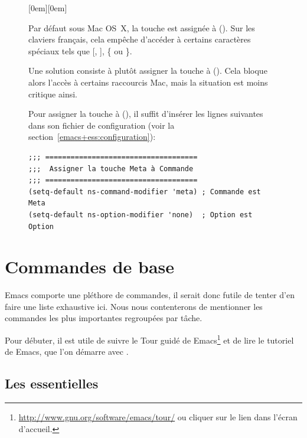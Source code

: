 \begin{figure}[t]
  \begin{framed}
    \begin{minipage}{0.1\linewidth}
      \raisebox{-1.5em}[0em][0em]{\HUGE\applekey}
    \end{minipage}
    \begin{minipage}[t]{0.85\linewidth}
      \small
      Par défaut sous Mac OS~X, la touche  est assignée à
       (\optkey). Sur les claviers français, cela empêche
      d'accéder à certains caractères spéciaux tels que [, ], \{ ou
      \}.

      Une solution consiste à plutôt assigner la touche  à
       (\cmdkey). Cela bloque alors l'accès à certains
      raccourcis Mac, mais la situation est moins critique ainsi.

      Pour assigner la touche  à  (\cmdkey),
      il suffit d'insérer les lignes suivantes dans son fichier de
      configuration  (voir la
      section~\ref{emacs+ess:configuration}):
\begin{verbatim}
;;; ====================================
;;;  Assigner la touche Meta à Commande
;;; ====================================
(setq-default ns-command-modifier 'meta) ; Commande est Meta
(setq-default ns-option-modifier 'none)	 ; Option est Option
\end{verbatim}
    \end{minipage}
  \end{framed}
\end{figure}



\section{Commandes de base}
\label{emacs+ess:commandes}

Emacs comporte une pléthore de commandes, il serait donc futile de
tenter d'en faire une liste exhaustive ici. Nous nous contenterons de
mentionner les commandes les plus importantes regroupées par tâche.

Pour débuter, il est utile de suivre le Tour guidé de Emacs\footnote{%
  \url{http://www.gnu.org/software/emacs/tour/} ou cliquer sur le lien
  dans l'écran d'accueil.} %
et de lire le tutoriel de Emacs, que l'on démarre avec .

\subsection{Les essentielles}
\label{emacs+ess:commandes:essentielles}

